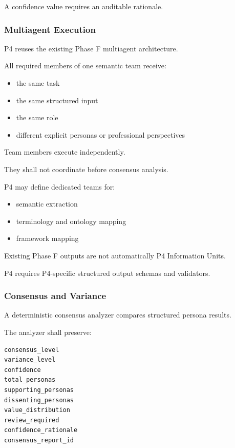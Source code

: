 A confidence value requires an auditable rationale.

\hypertarget{multiagent-execution}{%
\subsubsection{Multiagent Execution}\label{multiagent-execution}}

P4 reuses the existing Phase F multiagent architecture.

All required members of one semantic team receive:

\begin{itemize}
\tightlist
\item
  the same task
\item
  the same structured input
\item
  the same role
\item
  different explicit personas or professional perspectives
\end{itemize}

Team members execute independently.

They shall not coordinate before consensus analysis.

P4 may define dedicated teams for:

\begin{itemize}
\tightlist
\item
  semantic extraction
\item
  terminology and ontology mapping
\item
  framework mapping
\end{itemize}

Existing Phase F outputs are not automatically P4 Information Units.

P4 requires P4-specific structured output schemas and validators.

\hypertarget{consensus-and-variance}{%
\subsubsection{Consensus and Variance}\label{consensus-and-variance}}

A deterministic consensus analyzer compares structured persona results.

The analyzer shall preserve:

\begin{verbatim}
consensus_level
variance_level
confidence
total_personas
supporting_personas
dissenting_personas
value_distribution
review_required
confidence_rationale
consensus_report_id
\end{verbatim}

